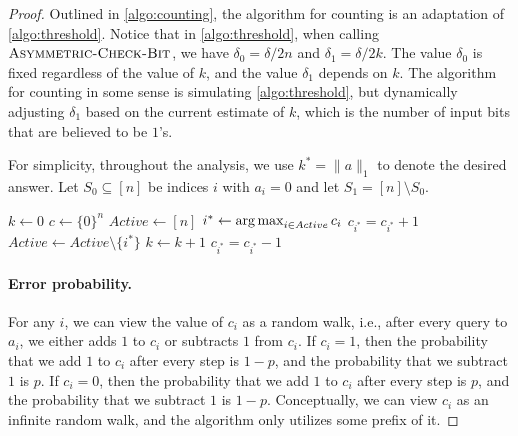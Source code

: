 \begin{proof}

Outlined in \cref{algo:counting}, the algorithm for counting is an adaptation of \cref{algo:threshold}. Notice that in \cref{algo:threshold}, when calling $\textsc{Asymmetric-Check-Bit}$, we have $\delta_0 = \delta/2n$ and $\delta_1 = \delta / 2k$. The value $\delta_0$ is fixed regardless of the value of $k$, and the value $\delta_1$ depends on $k$. The algorithm for counting in some sense is simulating \cref{algo:threshold}, but dynamically adjusting $\delta_1$ based on the current estimate of $k$, which is the number of input bits that are believed to be $1$'s.

For simplicity, throughout the analysis, we use $k^* = \lVert a \rVert_1$ to denote the desired answer. Let $S_0 \subseteq [n]$ be indices $i$ with $a_i = 0$ and let $S_1 = [n] \setminus S_0$.

\begin{algorithm}[ht]
\caption{}
\label{algo:counting}
\begin{algorithmic}[1]
\State $k \gets 0$
\State $c \gets \{0\}^n$
\State $Active \gets [n]$
\State $i^* \gets \operatorname*{arg\,max}_{i \in Active} c_i$
\EndIf
{}
\State $c_{i^*} = c_{i^*} + 1$
\State $Active \gets Active \setminus \{i^*\}$
\State $k \gets k + 1$
\EndIf
\Else
\State $c_{i^*} = c_{i^*} - 1$
\EndIf
\EndWhile
\EndProcedure
\end{algorithmic}
\end{algorithm}

\paragraph{Error probability.} For any $i$, we can view the value of $c_i$ as a random walk, i.e., after every query to $a_i$, we either adds $1$ to $c_i$ or subtracts $1$ from $c_i$. If $c_i = 1$, then the probability that we add $1$ to $c_i$ after every step is $1-p$, and the probability that we subtract $1$ is $p$. If $c_i = 0$, then the probability that we add $1$ to $c_i$ after every step is $p$, and the probability that we subtract $1$ is $1-p$. Conceptually, we can view $c_i$ as an infinite random walk, and the algorithm only utilizes some prefix of it.


\end{proof}
